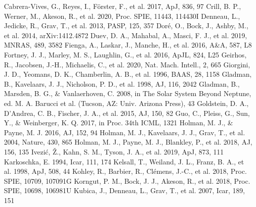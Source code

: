 \documentclass[twocolumn,linenumbers,anonymous]{aastex702}
\begin{document}
\begin{thebibliography}{}
 Cabrera-Vives, G., Reyes, I., F{\"o}rster, F., et al. 2017, ApJ, 836, 97
 Crill, B. P., Werner, M., Akeson, R., et al. 2020, Proc. SPIE, 11443, 114430I
 Denneau, L., Jedicke, R., Grav, T., et al. 2013, PASP, 125, 357
 Dor{\'e}, O., Bock, J., Ashby, M., et al. 2014, arXiv:1412.4872
 Duev, D. A., Mahabal, A., Masci, F. J., et al. 2019, MNRAS, 489, 3582
 Fienga, A., Laskar, J., Manche, H., et al. 2016, A\&A, 587, L8
 Fortney, J. J., Marley, M. S., Laughlin, G., et al. 2016, ApJL, 824, L25
 Geirhos, R., Jacobsen, J.-H., Michaelis, C., et al. 2020, Nat. Mach. Intell., 2, 665
 Giorgini, J. D., Yeomans, D. K., Chamberlin, A. B., et al. 1996, BAAS, 28, 1158
 Gladman, B., Kavelaars, J. J., Nicholson, P. D., et al. 1998, AJ, 116, 2042
 Gladman, B., Marsden, B. G., \& Vanlaerhoven, C. 2008, in The Solar System Beyond Neptune, ed. M. A. Barucci et al. (Tucson, AZ: Univ. Arizona Press), 43
 Goldstein, D. A., D'Andrea, C. B., Fischer, J. A., et al. 2015, AJ, 150, 82
 Guo, C., Pleiss, G., Sun, Y., \& Weinberger, K. Q. 2017, in Proc. 34th ICML, 1321
 Holman, M. J., \& Payne, M. J. 2016, AJ, 152, 94
 Holman, M. J., Kavelaars, J. J., Grav, T., et al. 2004, Nature, 430, 865
 Holman, M. J., Payne, M. J., Blankley, P., et al. 2018, AJ, 156, 135
 Ivezi{\'c}, {\v Z}., Kahn, S. M., Tyson, J. A., et al. 2019, ApJ, 873, 111
 Karkoschka, E. 1994, Icar, 111, 174
 Kelsall, T., Weiland, J. L., Franz, B. A., et al. 1998, ApJ, 508, 44
 Kohley, R., Barbier, R., Cl\'emens, J.-C., et al. 2018, Proc. SPIE, 10709, 107091G
 Korngut, P. M., Bock, J. J., Akeson, R., et al. 2018, Proc. SPIE, 10698, 106981U
 Kubica, J., Denneau, L., Grav, T., et al. 2007, Icar, 189, 151

\end{thebibliography}
\end{document}
